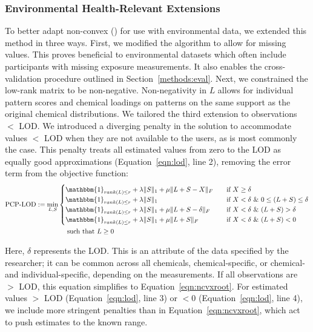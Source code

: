 \subsubsection{Environmental Health-Relevant Extensions} 

To better adapt non-convex \rootpcp (\ncpcpc) for use with environmental data, we extended this method in three ways. First, we modified the algorithm to allow for missing values. This proves beneficial to environmental datasets which often include participants with missing exposure measurements. It also enables the cross-validation procedure outlined in Section~\ref{methods:eval}. Next, we constrained the low-rank matrix to be non-negative. Non-negativity in $L$ allows for individual pattern scores and chemical loadings on patterns on the same support as the original chemical distributions. We tailored the third extension to observations $<$ LOD. We introduced a diverging penalty in the \ncpcp solution to accommodate values $<$ LOD when they are not available to the users, as is most commonly the case. This penalty treats all estimated values from zero to the LOD as equally good approximations (Equation~\ref{eqn:lod}, line 2), removing the error term from the objective function: 
\begin{equation}\label{eqn:lod}
\begin{aligned}
\text{PCP-LOD} := \min _{L, S} &
  \begin{cases}
  \mathbbm{1}_{rank(L) \le r} + \lambda\|S\|_{1} + \mu\|L+S-X\|_{F} 
  & \quad \text{if } X \ge \delta \\
  \mathbbm{1}_{rank(L) \le r} + \lambda\|S\|_{1} 
  & \quad \text{if } X < \delta \ \& \ 0 \le (L+S) \le \delta \\
  \mathbbm{1}_{rank(L) \le r} + \lambda\|S\|_{1} + \mu\|L+S-\delta\|_{F} 
  & \quad \text{if } X < \delta \ \& \ (L+S) > \delta\\
  \mathbbm{1}_{rank(L) \le r} + \lambda\|S\|_{1} + \mu\|L+S\|_{F} 
  & \quad \text{if } X < \delta \ \& \ (L+S) < 0 \\
  \end{cases} \\
  & \hspace{3ex} \text{such that } L \ge 0
\end{aligned}
\end{equation}

Here, $\delta$ represents the LOD. This is an attribute of the data specified by the researcher; it can be common across all chemicals, chemical-specific, or chemical- and individual-specific, depending on the measurements. If all observations are $>$ LOD, this equation simplifies to Equation~\ref{eqn:ncvxroot}. For estimated values $>$ LOD (Equation~\ref{eqn:lod}, line 3) or $<0$ (Equation~\ref{eqn:lod}, line 4), we include more stringent penalties than in Equation~\ref{eqn:ncvxroot}, which act to push estimates to the known range. 

